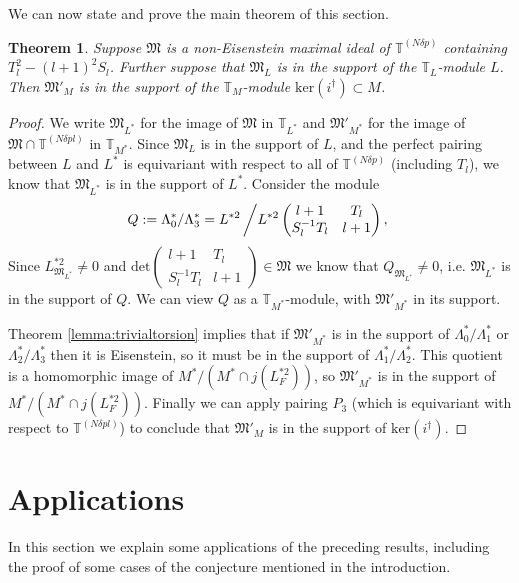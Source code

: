 \documentclass[a4paper, notitlepage]{amsart}
\newcommand{\M}{\ensuremath{\mathfrak{M}}\xspace}
\newtheorem{theorem}{Theorem}
\begin{document}
 We can now state and prove the main theorem of this section. 
\begin{theorem}\label{supporttheorem}Suppose $\mathfrak{M}$ is a non-Eisenstein maximal ideal of $\mathbb{T}^{(N\delta p)}$ containing $T_l^2-(l+1)^2 S_l$. Further suppose that $\mathfrak{M}_L$ is in the support of the $\mathbb{T}_L$-module $L$. Then $\mathfrak{M}'_M$ is in the support of the $\mathbb{T}_M$-module $\mathrm{ker}(i^\dagger)\subset M$.
\end{theorem}
\begin{proof}
We write $\mathfrak{M}_{L^*}$ for the image of $\mathfrak{M}$ in $\mathbb{T}_{L^*}$ and $\mathfrak{M}'_{M^*}$ for the image of $\mathfrak{M}\cap \mathbb{T}^{(N\delta pl)}$ in $\mathbb{T}_{M^*}$. Since $\mathfrak{M}_L$ is in the support of $L$, and the perfect pairing between $L$ and $L^*$ is equivariant with respect to all of $\mathbb{T}^{(N\delta p)}$ (including $T_l$), we know that $\mathfrak{M}_{L^*}$ is in the support of $L^*$. Consider the module $$Q:=\Lambda_0^*/\Lambda_3^*=L^{*2}\left/
L^{*2}\begin{pmatrix}l+1 & T_l \\ S_l^{-1}T_l & l+1 \end{pmatrix},\right.$$ Since $L^{*2}_{\mathfrak{M}_{L^*}}\neq 0$ and $\mathrm{det}\begin{pmatrix}l+1 & T_l \\ S_l^{-1}T_l & l+1 \end{pmatrix}\in \mathfrak{M}$ we know that $Q_{\mathfrak{M}_{L^*}}\neq 0$, i.e. $\mathfrak{M}_{L^*}$ is in the support of $Q$. We can view $Q$ as a $\mathbb{T}_{M^*}$-module, with $\M'_{M^*}$ in its support. 

Theorem \ref{lemma:trivialtorsion} implies that if $\M'_{M^*}$ is in the support of $\Lambda_0^*/\Lambda_1^*$ or $\Lambda_2^*/\Lambda_3^*$ then it is Eisenstein, so it must be in the support of $\Lambda_1^*/\Lambda_2^*$. This quotient is a homomorphic image of $M^*/(M^*\cap j(L_F^{*2}))$, so $\M'_{M^*}$ is in the support of $M^*/(M^*\cap j(L_F^{*2}))$. Finally we can apply pairing $P_3$ (which is equivariant with respect to $\mathbb{T}^{(N\delta pl)}$) to conclude that $\M'_M$ is in the support of $\mathrm{ker}(i^\dagger)$. 
\end{proof}

\section{Applications}\label{apps}
In this section we explain some applications of the preceding results, including the proof of some cases of the conjecture mentioned in the introduction.
\end{document}
